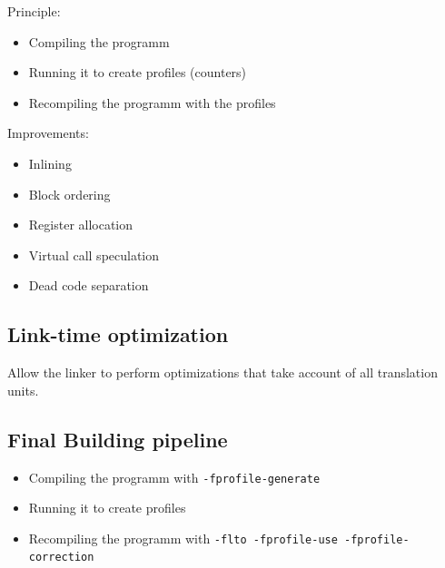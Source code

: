 \documentclass{beamer}
\begin{document}
    \begin{frame}
        Principle:
        \begin{itemize}
            \item Compiling the programm
            \item Running it to create profiles (counters)
            \item Recompiling the programm with the profiles
        \end{itemize}
    \end{frame}

    \begin{frame}
        Improvements:
        \begin{itemize}
            \item Inlining
            \item Block ordering
            \item Register allocation
            \item Virtual call speculation
            \item Dead code separation
        \end{itemize}
    \end{frame}

    \subsection{Link-time optimization}

    \begin{frame}
        Allow the linker to perform optimizations that take account of all translation units.
    \end{frame}

    \subsection{Final Building pipeline}

    \begin{frame}[fragile]
        \begin{itemize}
            \item Compiling the programm with \verb'-fprofile-generate'
            \item Running it to create profiles
            \item Recompiling the programm with \verb'-flto -fprofile-use -fprofile-correction'
        \end{itemize}
    \end{frame}
\end{document}
